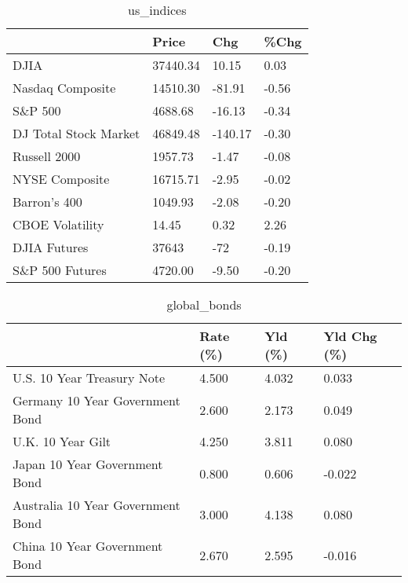 \documentclass{article}%
\begin{document}
%


\begin{table}[htbp]%
\caption{us\_indices}%
\centering%
\begin{adjustbox}{width=1\textwidth}%
\begin{tabular}{llll}
\toprule
                      &    Price &     Chg &  \%Chg \\
\midrule
                 DJIA & 37440.34 &   10.15 &  0.03 \\
     Nasdaq Composite & 14510.30 &  -81.91 & -0.56 \\
              S\&P 500 &  4688.68 &  -16.13 & -0.34 \\
DJ Total Stock Market & 46849.48 & -140.17 & -0.30 \\
         Russell 2000 &  1957.73 &   -1.47 & -0.08 \\
       NYSE Composite & 16715.71 &   -2.95 & -0.02 \\
         Barron's 400 &  1049.93 &   -2.08 & -0.20 \\
      CBOE Volatility &    14.45 &    0.32 &  2.26 \\
         DJIA Futures &    37643 &     -72 & -0.19 \\
      S\&P 500 Futures &  4720.00 &   -9.50 & -0.20 \\
\bottomrule
\end{tabular}
%
\end{adjustbox}%
\end{table}

%


\begin{table}[htbp]%
\caption{global\_bonds}%
\centering%
\begin{adjustbox}{width=1\textwidth}%
\begin{tabular}{llll}
\toprule
                                  & Rate (\%) & Yld (\%) & Yld Chg (\%) \\
\midrule
       U.S. 10 Year Treasury Note &    4.500 &   4.032 &       0.033 \\
  Germany 10 Year Government Bond &    2.600 &   2.173 &       0.049 \\
                U.K. 10 Year Gilt &    4.250 &   3.811 &       0.080 \\
    Japan 10 Year Government Bond &    0.800 &   0.606 &      -0.022 \\
Australia 10 Year Government Bond &    3.000 &   4.138 &       0.080 \\
    China 10 Year Government Bond &    2.670 &   2.595 &      -0.016 \\
\bottomrule
\end{tabular}
%
\end{adjustbox}%
\end{table}
\end{document}
